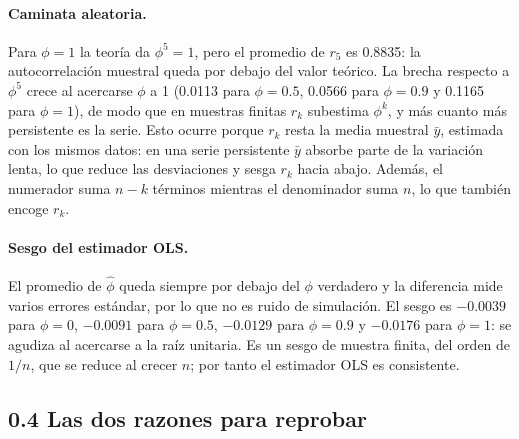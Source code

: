\documentclass[11pt]{article}
\begin{document}
\paragraph{Caminata aleatoria.} Para $\phi=1$ la teor\'ia da $\phi^5=1$, pero
el promedio de $r_5$ es 0.8835: la autocorrelaci\'on muestral queda por debajo
del valor te\'orico. La brecha respecto a $\phi^5$ crece al acercarse $\phi$ a 1
(0.0113 para $\phi=0.5$, 0.0566 para $\phi=0.9$ y 0.1165 para $\phi=1$), de
modo que en muestras finitas $r_k$ subestima $\phi^k$, y m\'as cuanto m\'as
persistente es la serie. Esto ocurre porque $r_k$ resta la media muestral
$\bar y$, estimada con los mismos datos: en una serie persistente $\bar y$
absorbe parte de la variaci\'on lenta, lo que reduce las desviaciones y
sesga $r_k$ hacia abajo. Adem\'as, el numerador suma $n-k$ t\'erminos mientras
el denominador suma $n$, lo que tambi\'en encoge $r_k$.

\paragraph{Sesgo del estimador OLS.} El promedio de $\hat\phi$ queda siempre
por debajo del $\phi$ verdadero y la diferencia mide varios errores
est\'andar, por lo que no es ruido de simulaci\'on. El sesgo es
$-0.0039$ para $\phi=0$, $-0.0091$ para $\phi=0.5$, $-0.0129$ para
$\phi=0.9$ y $-0.0176$ para $\phi=1$: se agudiza al acercarse a la ra\'iz
unitaria. Es un sesgo de muestra finita, del orden de $1/n$, que se reduce al
crecer $n$; por tanto el estimador OLS es consistente.

\subsection*{0.4 Las dos razones para reprobar}

\begin{table}[H]
\centering
{}
\caption{Procesos sin memoria $Y_t=m_t+\varepsilon_t$ con 5{,}000 r\'eplicas
($n=300$). Semillas: \texttt{SEED\_BASE}$+0$ para $\phi=0$,
\texttt{SEED\_BASE}$+10$ para (a) y \texttt{SEED\_BASE}$+11$ para (b).}
\label{tab:p04}
\end{table}
\end{document}
